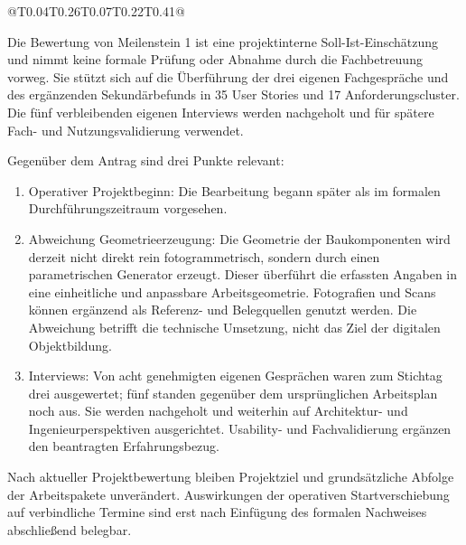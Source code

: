 \documentclass[type=zwischenbericht]{zukunftbau}
\begin{document}
\begin{Table}[title=Meilensteine gemäß Zuwendungsbescheid\, Ziffer 8.3]
\begin{SemioTable}{@{}T{0.04\tabcolsep}T{0.26\tabcolsep}T{0.07\tabcolsep}T{0.22\tabcolsep}T{0.41\tabcolsep}@{}}
\end{SemioTable}
\end{Table}

Die Bewertung von Meilenstein 1 ist eine projektinterne Soll-Ist-Einschätzung und nimmt keine formale Prüfung oder Abnahme durch die Fachbetreuung vorweg. Sie stützt sich auf die Überführung der drei eigenen Fachgespräche und des ergänzenden Sekundärbefunds in 35 User Stories und 17 Anforderungscluster. Die fünf verbleibenden eigenen Interviews werden nachgeholt und für spätere Fach- und Nutzungsvalidierung verwendet.

Gegenüber dem Antrag sind drei Punkte relevant:

\begin{enumerate}
\item Operativer Projektbeginn: Die Bearbeitung begann später als im formalen Durchführungszeitraum vorgesehen.
\item Abweichung Geometrieerzeugung: Die Geometrie der Baukomponenten wird derzeit nicht direkt rein fotogrammetrisch, sondern durch einen parametrischen Generator erzeugt. Dieser überführt die erfassten Angaben in eine einheitliche und anpassbare Arbeitsgeometrie. Fotografien und Scans können ergänzend als Referenz- und Belegquellen genutzt werden. Die Abweichung betrifft die technische Umsetzung, nicht das Ziel der digitalen Objektbildung.
\item Interviews: Von acht genehmigten eigenen Gesprächen waren zum Stichtag drei ausgewertet; fünf standen gegenüber dem ursprünglichen Arbeitsplan noch aus. Sie werden nachgeholt und weiterhin auf Architektur- und Ingenieurperspektiven ausgerichtet. Usability- und Fachvalidierung ergänzen den beantragten Erfahrungsbezug.
\end{enumerate}

Nach aktueller Projektbewertung bleiben Projektziel und grundsätzliche Abfolge der Arbeitspakete unverändert. Auswirkungen der operativen Startverschiebung auf verbindliche Termine sind erst nach Einfügung des formalen Nachweises abschließend belegbar.
\end{document}
